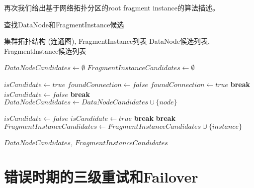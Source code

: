 再次我们给出基于网络拓扑分区的root fragment instance的算法描述。
\begin{algorithm}
  \caption{查找DataNode和FragmentInstance候选}
  \label{alg:find_candidates}
  \begin{algorithmic}
  \REQUIRE 集群拓扑结构 (连通图), FragmentInstance列表
  \ENSURE DataNode候选列表, FragmentInstance候选列表
  
  \STATE $DataNodeCandidates \leftarrow \emptyset$
  \STATE $FragmentInstanceCandidates \leftarrow \emptyset$
  
      \STATE $isCandidate \leftarrow true$
          \STATE $foundConnection \leftarrow false$
                  \STATE $foundConnection \leftarrow true$
                  \STATE \textbf{break} 
              \ENDIF
          \ENDFOR
              \STATE $isCandidate \leftarrow false$
              \STATE \textbf{break} 
          \ENDIF
      \ENDFOR
          \STATE $DataNodeCandidates \leftarrow DataNodeCandidates \cup \{node\}$
      \ENDIF
  \ENDFOR
  
      \STATE $isCandidate \leftarrow false$
                  \STATE $isCandidate \leftarrow true$
                  \STATE \textbf{break} 
              \ENDIF
          \ENDFOR
              \STATE \textbf{break} 
          \ENDIF
      \ENDFOR
          \STATE $FragmentInstanceCandidates \leftarrow FragmentInstanceCandidates \cup \{instance\}$
      \ENDIF
  \ENDFOR
  
  \RETURN $DataNodeCandidates$, $FragmentInstanceCandidates$
  \end{algorithmic}
  \end{algorithm}

\section{错误时期的三级重试和Failover}

